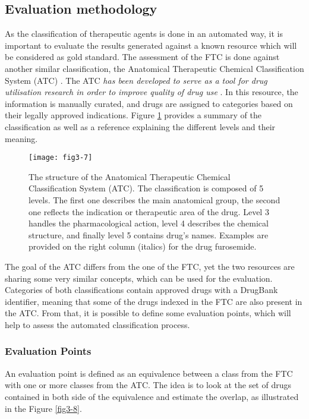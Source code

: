 \subsection{Evaluation methodology}
\label{evaluation}

As the classification of therapeutic agents is done in an automated way, it is important to evaluate the results generated against a known resource which will be considered as gold standard. The assessment of the FTC is done against another similar classification, the Anatomical Therapeutic Chemical Classification System (ATC) \citep{world2006anatomical}. The ATC \emph{has been developed to serve as a tool for drug utilisation research in order to improve quality of drug use} \citep{world2006anatomical}. In this resource, the information is manually curated, and drugs are assigned to categories based on their legally approved indications. Figure \ref{fig3-7} provides a summary of the classification as well as a reference explaining the different levels and their meaning.

\begin{figure}[ht]
    \centering
    \texttt{[image: fig3-7]}
    \caption{The structure of the Anatomical Therapeutic Chemical Classification System (ATC). The classification is composed of 5 levels. The first one describes the main anatomical group, the second one reflects the indication or therapeutic area of the drug. Level 3 handles the pharmacological action, level 4 describes the chemical structure, and finally level 5 contains drug's names. Examples are provided on the right column (italics) for the drug furosemide.}
    \label{fig3-7}
\end{figure}

The goal of the ATC differs from the one of the FTC, yet the two resources are sharing some very similar concepts, which can be used for the evaluation. Categories of both classifications contain approved drugs with a DrugBank identifier, meaning that some of the drugs indexed in the FTC are also present in the ATC. From that, it is possible to define some evaluation points, which will help to assess the automated classification process.

\subsubsection{Evaluation Points}
An evaluation point is defined as an equivalence between a class from the FTC with one or more classes from the ATC. The idea is to look at the set of drugs contained in both side of the equivalence and estimate the overlap, as illustrated in the Figure \ref{fig3-8}.

